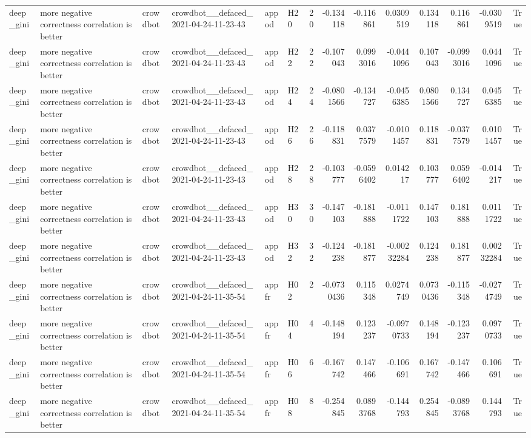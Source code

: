 \begin{longtable}{llllllrrrrrrrr}
deep\_gini & more negative correctness correlation is better & crowdbot & crowdbot\_\_defaced\_2021-04-24-11-23-43 & appod & H20 & 20 & -0.134118 & -0.116861 & 0.0309519 & 0.134118 & 0.116861 & -0.0309519 & True \\
deep\_gini & more negative correctness correlation is better & crowdbot & crowdbot\_\_defaced\_2021-04-24-11-23-43 & appod & H22 & 22 & -0.107043 & 0.0993016 & -0.0441096 & 0.107043 & -0.0993016 & 0.0441096 & True \\
deep\_gini & more negative correctness correlation is better & crowdbot & crowdbot\_\_defaced\_2021-04-24-11-23-43 & appod & H24 & 24 & -0.0801566 & -0.134727 & -0.0456385 & 0.0801566 & 0.134727 & 0.0456385 & True \\
deep\_gini & more negative correctness correlation is better & crowdbot & crowdbot\_\_defaced\_2021-04-24-11-23-43 & appod & H26 & 26 & -0.118831 & 0.0377579 & -0.0101457 & 0.118831 & -0.0377579 & 0.0101457 & True \\
deep\_gini & more negative correctness correlation is better & crowdbot & crowdbot\_\_defaced\_2021-04-24-11-23-43 & appod & H28 & 28 & -0.103777 & -0.0596402 & 0.014217 & 0.103777 & 0.0596402 & -0.014217 & True \\
deep\_gini & more negative correctness correlation is better & crowdbot & crowdbot\_\_defaced\_2021-04-24-11-23-43 & appod & H30 & 30 & -0.147103 & -0.181888 & -0.0111722 & 0.147103 & 0.181888 & 0.0111722 & True \\
deep\_gini & more negative correctness correlation is better & crowdbot & crowdbot\_\_defaced\_2021-04-24-11-23-43 & appod & H32 & 32 & -0.124238 & -0.181877 & -0.00232284 & 0.124238 & 0.181877 & 0.00232284 & True \\
deep\_gini & more negative correctness correlation is better & crowdbot & crowdbot\_\_defaced\_2021-04-24-11-35-54 & appfr & H02 & 2 & -0.0730436 & 0.115348 & 0.0274749 & 0.0730436 & -0.115348 & -0.0274749 & True \\
deep\_gini & more negative correctness correlation is better & crowdbot & crowdbot\_\_defaced\_2021-04-24-11-35-54 & appfr & H04 & 4 & -0.148194 & 0.123237 & -0.0970733 & 0.148194 & -0.123237 & 0.0970733 & True \\
deep\_gini & more negative correctness correlation is better & crowdbot & crowdbot\_\_defaced\_2021-04-24-11-35-54 & appfr & H06 & 6 & -0.167742 & 0.147466 & -0.106691 & 0.167742 & -0.147466 & 0.106691 & True \\
deep\_gini & more negative correctness correlation is better & crowdbot & crowdbot\_\_defaced\_2021-04-24-11-35-54 & appfr & H08 & 8 & -0.254845 & 0.0893768 & -0.144793 & 0.254845 & -0.0893768 & 0.144793 & True \\

\end{longtable}
